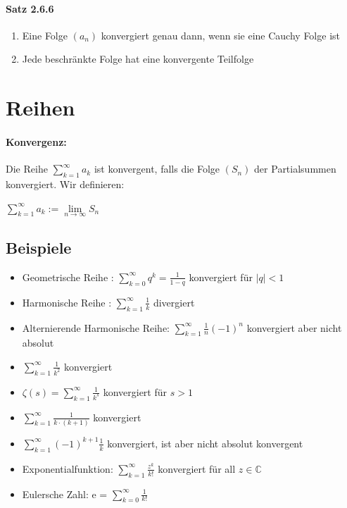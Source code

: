 \documentclass[8pt]{extreport}
\begin{document}
\paragraph{Satz 2.6.6}
\begin{enumerate}
\item Eine Folge $(a_{n})$ konvergiert genau dann, wenn sie eine Cauchy Folge ist
\item Jede beschränkte Folge hat eine konvergente Teilfolge
\end{enumerate}
\section{Reihen}
\paragraph{Konvergenz:} Die Reihe $\displaystyle\sum_{k=1}^{\infty}a_{k}$ ist konvergent, falls die Folge $(S_{n})$ der Partialsummen konvergiert. Wir definieren:
\begin{center}
$\displaystyle\sum_{k=1}^{\infty}a_k := \lim\limits_{n \to \infty} S_n$
\end{center}
\newpage
\subsection{Beispiele}
\begin{itemize}
\item Geometrische Reihe : $\displaystyle\sum _{k=0}^{\infty}q^k = \frac{1}{1-q}$ konvergiert für $|q| < 1$
\item Harmonische Reihe : $\displaystyle\sum _{k=1}^{\infty} \frac{1}{k}$ divergiert
\item Alternierende Harmonische Reihe: $\displaystyle\sum_{k=1}^{\infty}\frac{1}{n}(-1)^n$ konvergiert aber nicht absolut
\item $\displaystyle\sum _{k=1}^{\infty} \frac{1}{k^2}$ konvergiert
\item $\zeta(s) = \displaystyle\sum_{k=1}^{\infty}\frac{1}{k^s}$ konvergiert für $s>1$
\item $\displaystyle\sum_{k=1}^{\infty}\frac{1}{k\cdot(k+1)}$ konvergiert
\item $\displaystyle\sum_{k=1}^{\infty}(-1)^{k+1}\frac{1}{k}$ konvergiert, ist aber nicht absolut konvergent
\item Exponentialfunktion: $\displaystyle\sum_{k=1}^{\infty}\frac{z^k}{k!}$ konvergiert für all $z \in \mathbb{C}$
\item Eulersche Zahl: e = $\displaystyle\sum_{k=0}^{\infty}\frac{1}{k!}$
\end{itemize}
\end{document}
